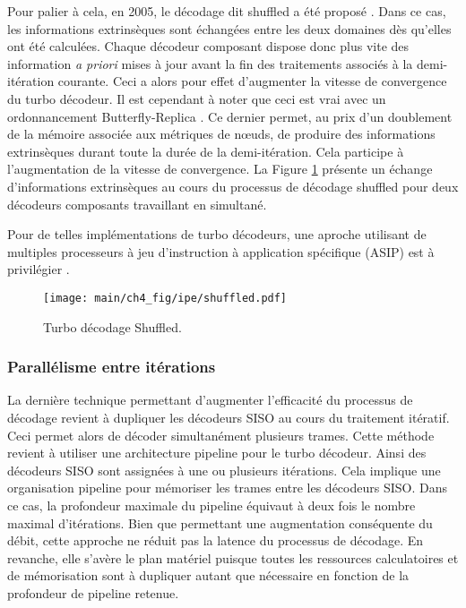 Pour palier à cela, en 2005, le décodage dit shuffled a été proposé \cite{turbo_shuff}. Dans ce cas,  les informations extrinsèques sont échangées entre les deux domaines dès qu'elles ont 
été calculées. Chaque décodeur composant dispose donc plus vite des information \textit{a priori} mises à jour avant la 
fin des traitements associés à la demi-itération courante. Ceci a 
alors pour effet d'augmenter la vitesse de convergence du turbo décodeur. 
Il est cependant à noter que ceci est 
vrai avec un ordonnancement Butterfly-Replica \cite{butt_replica}. Ce dernier permet, au prix d'un doublement de 
la mémoire associée aux métriques de nœuds, de produire des informations extrinsèques durant toute la durée de la demi-itération. 
Cela participe à l'augmentation de la vitesse de convergence.
La Figure \ref{fig:turbo_shuff} présente un échange d'informations extrinsèques au cours du processus de décodage 
shuffled pour deux décodeurs composants travaillant en simultané.

Pour de telles implémentations de turbo décodeurs, une aproche utilisant de multiples processeurs à jeu d’instruction à 
application spécifique (ASIP) est à privilégier \cite{asip}.

\begin{figure}[!h]
	\centering
	\texttt{[image: main/ch4\_fig/ipe/shuffled.pdf]}
	\caption{Turbo décodage Shuffled. \label{fig:turbo_shuff}}
\end{figure}

\subsubsection{Parallélisme entre itérations}
La dernière technique permettant d'augmenter l'efficacité du processus de décodage revient à dupliquer les décodeurs SISO 
au cours du traitement itératif. Ceci permet alors de décoder simultanément plusieurs trames. Cette méthode revient à utiliser une architecture 
pipeline pour le turbo décodeur. Ainsi des décodeurs SISO sont assignées à une ou plusieurs itérations. Cela implique une organisation pipeline pour mémoriser les trames entre les décodeurs SISO. Dans ce cas, la profondeur maximale du pipeline équivaut à deux fois le nombre 
maximal d'itérations. Bien que permettant une augmentation 
conséquente du débit, cette approche ne réduit pas la latence du processus de décodage. En revanche, elle s'avère
le plan matériel puisque toutes les ressources calculatoires et de mémorisation sont à dupliquer autant que nécessaire en fonction de la profondeur de pipeline retenue.


